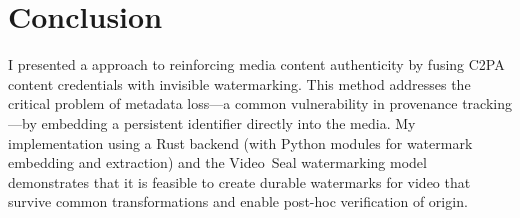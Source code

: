 \documentclass[12pt, technote]{IEEEtran}
\begin{document}
\section{Conclusion}
I presented a approach to reinforcing media content authenticity by fusing C2PA content credentials with invisible watermarking. This method addresses the critical problem of metadata loss—a common vulnerability in provenance tracking—by embedding a persistent identifier directly into the media. My implementation using a Rust backend (with Python modules for watermark embedding and extraction) and the Video Seal watermarking model demonstrates that it is feasible to create durable watermarks for video that survive common transformations and enable post-hoc verification of origin.\\


%
%

\end{document}

